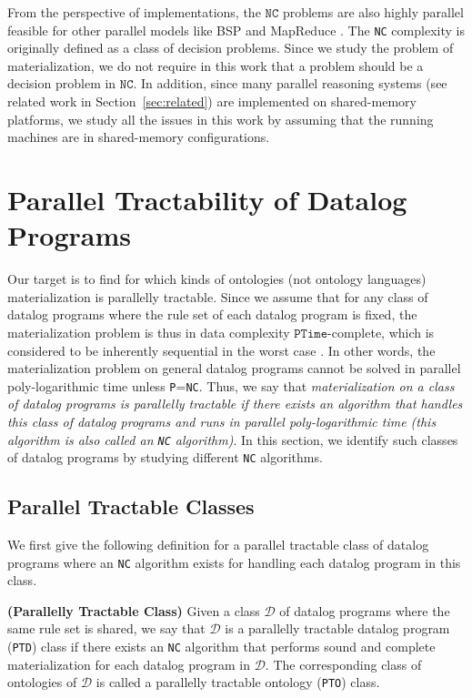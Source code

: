 \documentclass[final,1p,times]{elsarticle}
\begin{document}
From the perspective of implementations, the $\texttt{NC}$ problems are also highly
parallel feasible for other parallel models like BSP \cite{Valiant90}
and MapReduce \cite{KarloffSV10}. The \texttt{NC} complexity is originally defined
as a class of decision problems. Since we study the problem of materialization, we do not
require in this work that a problem should be a decision problem in $\texttt{NC}$.
In addition, since many parallel reasoning systems (see related work in Section~\ref{sec:related})
are implemented on shared-memory platforms, we
study all the issues in this work by assuming that the running machines are in
shared-memory configurations.


\section{Parallel Tractability of Datalog Programs}
\label{sec:ptclass}

Our target is to find for which kinds of ontologies (not ontology languages)
materialization is parallelly tractable.
Since we assume that for any class of datalog programs where the rule
set of each datalog program is fixed, the materialization problem is thus in data complexity
$\texttt{PTime}$-complete, which is considered to be inherently sequential in the worst
case \cite{Raymond95}. In other words, the materialization problem on general
datalog programs cannot be solved in parallel poly-logarithmic time unless \texttt{P}=\texttt{NC}.
Thus, we say that \emph{materialization on a class of datalog programs is parallelly tractable
if there exists an algorithm that handles this class of datalog programs and runs in parallel
poly-logarithmic time (this algorithm is also called an \texttt{NC} algorithm)}.
In this section, we identify such classes of datalog programs by studying different \texttt{NC} algorithms.


\subsection{Parallel Tractable Classes}

We first give the following definition for a parallel tractable class of datalog programs
where an \texttt{NC} algorithm exists for handling each datalog program in this class.

\begin{definition}\label{def:ptd}
\textbf{(Parallelly Tractable Class)} Given a class $\mathcal{D}$ of datalog programs where the
same rule set is shared, we say that $\mathcal{D}$ is a parallelly tractable datalog program (\texttt{PTD}) class
if there exists an \texttt{NC} algorithm that performs sound and complete materialization for each datalog program
in $\mathcal{D}$. The corresponding class of ontologies of $\mathcal{D}$ is called a
parallelly tractable ontology (\texttt{PTO}) class.
\end{definition}
\end{document}
